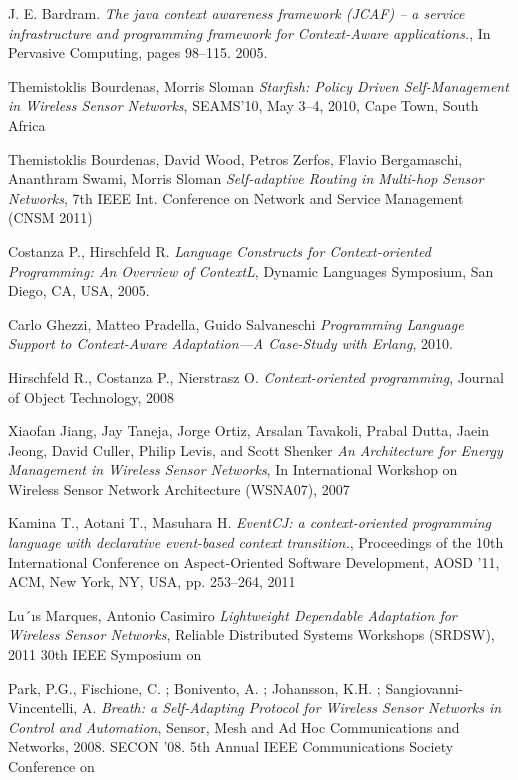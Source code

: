 \begin{thebibliography}{1}

J. E. Bardram. \emph{The java context awareness framework (JCAF) – a service infrastructure and programming framework for Context-Aware applications.}, 
In Pervasive Computing, pages 98–115. 2005.

Themistoklis Bourdenas, Morris Sloman
\emph{Starﬁsh: Policy Driven Self-Management in Wireless Sensor Networks},
SEAMS’10, May 3–4, 2010, Cape Town, South Africa

Themistoklis Bourdenas, David Wood, Petros Zerfos, Flavio Bergamaschi, Ananthram Swami, Morris Sloman
\emph{Self-adaptive Routing in Multi-hop Sensor Networks},
7th IEEE Int. Conference on Network and Service Management (CNSM 2011)

Costanza P., Hirschfeld R. \emph{Language Constructs for Context-oriented Programming: An Overview of ContextL},
Dynamic Languages Symposium, San Diego, CA, USA, 2005.

Carlo Ghezzi, Matteo Pradella, Guido Salvaneschi \emph{Programming Language Support to Context-Aware Adaptation—A Case-Study with Erlang}, 2010.

Hirschfeld R., Costanza P., Nierstrasz O. 
\emph{Context-oriented programming},
Journal of Object Technology, 2008

Xiaofan Jiang, Jay Taneja, Jorge Ortiz, Arsalan Tavakoli, Prabal Dutta, Jaein Jeong, David Culler, Philip Levis, and Scott Shenker
\emph{An Architecture for Energy Management in Wireless Sensor Networks},
In International Workshop on Wireless Sensor Network Architecture (WSNA07), 2007

Kamina T., Aotani T., Masuhara H. \emph{EventCJ: a context-oriented programming language with declarative event-based context transition.},
Proceedings of the 10th International Conference on Aspect-Oriented Software Development, AOSD ’11, ACM, New York, NY, USA, pp. 253–264, 2011

Lu´ıs Marques, Antonio Casimiro
\emph{Lightweight Dependable Adaptation for Wireless Sensor Networks},
Reliable Distributed Systems Workshops (SRDSW), 2011 30th IEEE Symposium on

Park, P.G., Fischione, C. ; Bonivento, A. ; Johansson, K.H. ; Sangiovanni-Vincentelli, A.
\emph{Breath: a Self-Adapting Protocol for Wireless Sensor Networks in Control and Automation},
Sensor, Mesh and Ad Hoc Communications and Networks, 2008. SECON '08. 5th Annual IEEE Communications Society Conference on


\end{thebibliography}

